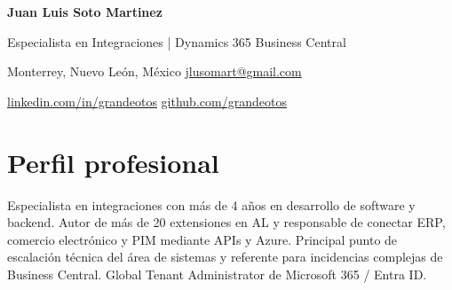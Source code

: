\documentclass[10pt,letterpaper]{article}
\begin{document}
\begingroup\centering
{\fontsize{18}{21}\selectfont\bfseries Juan Luis Soto Martinez}\par
{\normalsize Especialista en Integraciones | Dynamics 365 Business Central}\par
Monterrey, Nuevo León, México \enspace\textbar\enspace \href{mailto:jlusomart@gmail.com}{jlusomart@gmail.com}\par
\href{https://linkedin.com/in/grandeotos}{linkedin.com/in/grandeotos} \enspace\textbar\enspace
\href{https://github.com/grandeotos}{github.com/grandeotos}\par\endgroup

\section{Perfil profesional}
Especialista en integraciones con más de 4 años en desarrollo de software y backend. Autor de más de 20 extensiones en AL y responsable de conectar ERP, comercio electrónico y PIM mediante APIs y Azure. Principal punto de escalación técnica del área de sistemas y referente para incidencias complejas de Business Central. Global Tenant Administrator de Microsoft 365 / Entra ID.
\end{document}
